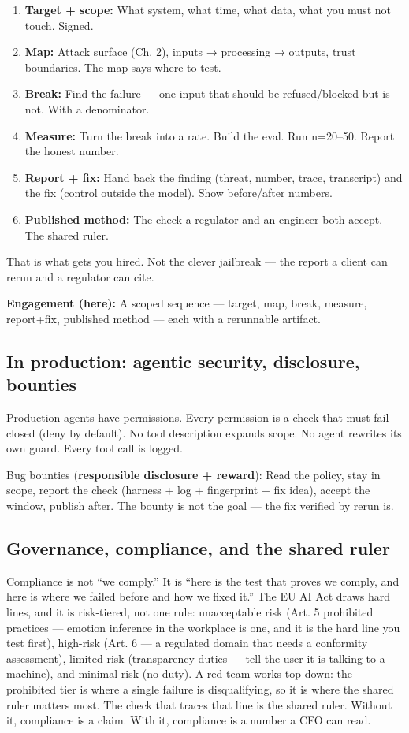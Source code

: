 \begin{enumerate}
\item \textbf{Target + scope:} What system, what time, what data, what you must not touch. Signed.
\item \textbf{Map:} Attack surface (Ch. 2), inputs → processing → outputs, trust boundaries. The map says where to test.
\item \textbf{Break:} Find the failure — one input that should be refused/blocked but is not. With a denominator.
\item \textbf{Measure:} Turn the break into a rate. Build the eval. Run n=20–50. Report the honest number.
\item \textbf{Report + fix:} Hand back the finding (threat, number, trace, transcript) and the fix (control outside the model). Show before/after numbers.
\item \textbf{Published method:} The check a regulator and an engineer both accept. The shared ruler.
\end{enumerate}

That is what gets you hired. Not the clever jailbreak — the report a client can rerun and a regulator can cite.

\begin{defbox}
\textbf{Engagement (here):} A scoped sequence — target, map, break, measure, report+fix, published method — each with a rerunnable artifact.
\end{defbox}

\subsection{In production: agentic security, disclosure, bounties}
Production agents have permissions. Every permission is a check that must fail closed (deny by default). No tool description expands scope. No agent rewrites its own guard. Every tool call is logged.

Bug bounties (\textbf{responsible disclosure + reward}): Read the policy, stay in scope, report the check (harness + log + fingerprint + fix idea), accept the window, publish after. The bounty is not the goal — the fix verified by rerun is.

\subsection{Governance, compliance, and the shared ruler}
Compliance is not ``we comply.'' It is ``here is the test that proves we comply, and here is where we failed before and how we fixed it.'' The EU AI Act draws hard lines, and it is risk-tiered, not one rule: unacceptable risk (Art. 5 prohibited practices — emotion inference in the workplace is one, and it is the hard line you test first), high-risk (Art. 6 — a regulated domain that needs a conformity assessment), limited risk (transparency duties — tell the user it is talking to a machine), and minimal risk (no duty). A red team works top-down: the prohibited tier is where a single failure is disqualifying, so it is where the shared ruler matters most. The check that traces that line is the shared ruler. Without it, compliance is a claim. With it, compliance is a number a CFO can read.

